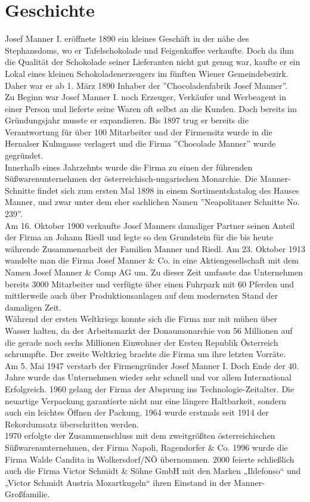\section{Geschichte}
Josef Manner I. eröffnete 1890 ein kleines Geschäft in der nähe des Stephansdoms, wo er Tafelschokolade und Feigenkaffee verkaufte. Doch da ihm die Qualität der Schokolade seiner Lieferanten nicht gut genug war, kaufte er ein Lokal eines kleinen Schokoladenerzeugers im fünften Wiener Gemeindebezirk. Daher war er ab 1. März 1890 Inhaber der ''Chocoladenfabrik Josef Manner''. \\
Zu Beginn war Josef Manner I. noch Erzeuger, Verkäufer und Werbeagent in einer Person und lieferte seine Waren oft selbst an die Kunden. Doch bereits im Gründungsjahr musste er expandieren. Bis 1897 trug er bereits die Verantwortung für über 100 Mitarbeiter und der Firmensitz wurde in die Hernalser Kulmgasse verlagert und die Firma ''Chocolade Manner'' wurde gegründet.\\
Innerhalb eines Jahrzehnts wurde die Firma zu einen der führenden Süßwarenunternehmen der österreichisch-ungarischen Monarchie. 
Die Manner-Schnitte findet sich zum ersten Mal 1898 in einem Sortimentskatalog des Hauses Manner, und zwar unter dem eher sachlichen Namen ''Neapolitaner Schnitte No. 239''. \\
Am 16. Oktober 1900 verkaufte Josef Manners damaliger Partner seinen Anteil der Firma an Johann Riedl  und legte so den Grundstein für die bis heute währende Zusammenarbeit der Familien Manner und Riedl.
Am 23. Oktober 1913 wandelte man die Firma Josef Manner \& Co. in eine Aktiengesellschaft mit dem Namen Josef Manner \& Comp AG um. Zu dieser Zeit umfasste das Unternehmen bereits 3000 Mitarbeiter und verfügte über einen Fuhrpark mit 60 Pferden und mittlerweile auch über Produktionsanlagen auf dem modernsten Stand der damaligen Zeit. \\
Während der ersten Weltkriegs konnte sich die Firma nur mit mühen über Wasser halten, da der Arbeitsmarkt der Donaumonarchie von 56 Millionen auf die gerade noch sechs Millionen Einwohner der Ersten Republik Österreich schrumpfte. Der zweite Weltkrieg brachte die Firma um ihre letzten Vorräte.\\
Am 5. Mai 1947 verstarb der Firmengründer Josef Manner I. Doch Ende der 40. Jahre wurde das Unternehmen wieder sehr schnell und vor allem International Erfolgreich. 1960 gelang der Firma der Absprung ins Technologie-Zeitalter. Die neuartige Verpackung garantierte nicht nur eine längere Haltbarkeit, sondern auch ein leichtes Öffnen der Packung. 1964 wurde erstmals seit 1914 der Rekordumsatz überschritten werden.\\
1970 erfolgte der Zusammenschluss mit dem zweitgrößten österreichischen Süßwarenunternehmen, der Firma Napoli, Ragendorfer \& Co. 1996 wurde die Firma Walde Candita in Wolkersdorf/NÖ übernommen. 2000 feierte schließlich auch die Firma Victor Schmidt \& Söhne GmbH mit den Marken „Ildefonso“ und „Victor Schmidt Austria Mozartkugeln“ ihren Einstand in der Manner-Großfamilie. \cite{josef_manner}